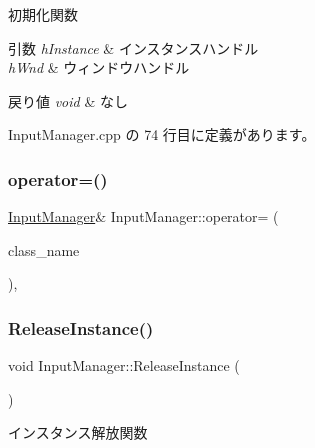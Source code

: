 初期化関数 


\begin{DoxyParams}{引数}
{\em h\+Instance} & インスタンスハンドル \\
\hline
{\em h\+Wnd} & ウィンドウハンドル \\
\hline
\end{DoxyParams}

\begin{DoxyRetVals}{戻り値}
{\em void} & なし \\
\hline
\end{DoxyRetVals}


 Input\+Manager.\+cpp の 74 行目に定義があります。

\mbox{\label{class_input_manager_a4b1d021f5dcd4e029f5210b7dd99fa36}} 
\subsubsection{\texorpdfstring{operator=()}{operator=()}}
{\footnotesize\ttfamily \mbox{\hyperlink{class_input_manager}{Input\+Manager}}\& Input\+Manager\+::operator= (\begin{DoxyParamCaption}\item[{const \mbox{\hyperlink{class_input_manager}{Input\+Manager}} \&}]{class\+\_\+name }\end{DoxyParamCaption})\hspace{0.3cm}{\ttfamily [private]}, {\ttfamily [delete]}}

\mbox{\label{class_input_manager_a6bc6f6dd42c2ec560b4d1f1bdca528cb}} 
\subsubsection{\texorpdfstring{Release\+Instance()}{ReleaseInstance()}}
{\footnotesize\ttfamily void Input\+Manager\+::\+Release\+Instance (\begin{DoxyParamCaption}{ }\end{DoxyParamCaption})\hspace{0.3cm}{\ttfamily [static]}}



インスタンス解放関数 


